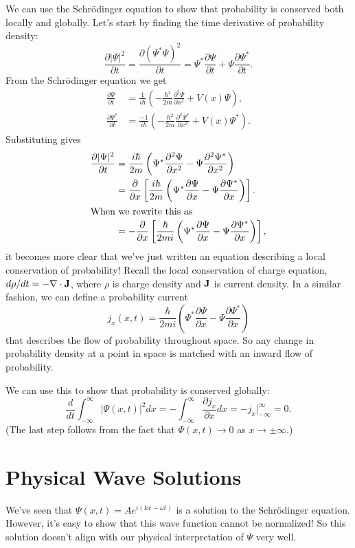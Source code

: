 \documentclass[../p052main.tex]{subfiles}
\begin{document}
We can use the Schrödinger equation to show that probability is conserved both locally and globally.
Let's start by finding the time derivative of probability density:
\[ \frac{\partial |\Psi|^2}{\partial t} = \frac{\partial (\Psi^*\Psi)^2}{\partial t} = \Psi^* \frac{\partial \Psi}{\partial t} + \Psi \frac{\partial \Psi^*}{\partial t}. \]
From the Schrödinger equation we get
\begin{align*}
    \frac{\partial \Psi}{\partial t} &= \frac{1}{i\hbar} \left( -\frac{\hbar^2}{2m}\frac{\partial^2 \Psi}{\partial x^2} + V(x) \Psi \right), \\
    \frac{\partial \Psi^*}{\partial t} &= \frac{-1}{i\hbar} \left( -\frac{\hbar^2}{2m}\frac{\partial^2 \Psi^*}{\partial x^2} + V(x) \Psi^* \right).
\end{align*}
Substituting gives
\begin{align*}
    \frac{\partial |\Psi|^2}{\partial t} &= \frac{i\hbar}{2m} \left( \Psi^* \frac{\partial^2 \Psi}{\partial x^2} - \Psi \frac{\partial^2 \Psi^*}{\partial x^2} \right) \\
    &= \frac{\partial}{\partial x} \left[ \frac{i\hbar}{2m} \left( \Psi^* \frac{\partial \Psi}{\partial x} - \Psi \frac{\partial \Psi^*}{\partial x} \right) \right]. \\
    \intertext{When we rewrite this as}
    &= -\frac{\partial}{\partial x} \left[ \frac{\hbar}{2mi} \left( \Psi^* \frac{\partial \Psi}{\partial x} - \Psi \frac{\partial \Psi^*}{\partial x} \right) \right],
\end{align*}
it becomes more clear that we've just written an equation describing a local conservation of probability!
Recall the local conservation of charge equation, $d\rho/dt = -\nabla \cdot \mathbf{J}$, where $\rho$ is charge density and $\mathbf{J}$ is current density.
In a similar fashion, we can define a probability current
\[ j_x(x,t) = \frac{\hbar}{2mi} \left( \Psi^* \frac{\partial \Psi}{\partial x} - \Psi \frac{\partial \Psi^*}{\partial x} \right) \]
that describes the flow of probability throughout space.
So any change in probability density at a point in space is matched with an inward flow of probability.

We can use this to show that probability is conserved globally:
\[ \frac{d}{dt} \int_{-\infty}^{\infty} |\Psi(x,t)|^2 dx = -\int_{-\infty}^{\infty} \frac{\partial j_x}{\partial x}dx = -j_x \Big|_{-\infty}^\infty = 0. \]
(The last step follows from the fact that $\Psi(x,t) \to 0$ as $x \to \pm \infty$.)

\section{Physical Wave Solutions}
We've seen that $\Psi(x,t) = Ae^{i(kx - \omega t)}$ is a solution to the Schrödinger equation.
However, it's easy to show that this wave function cannot be normalized!
So this solution doesn't align with our physical interpretation of $\Psi$ very well.
\end{document}

